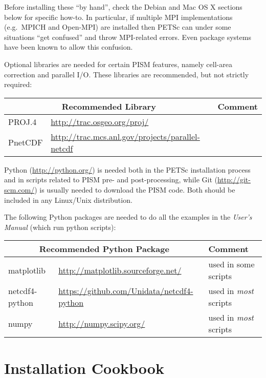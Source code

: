 \documentclass[titlepage,letterpaper,final]{scrartcl}
\begin{document}
Before installing these ``by hand'', check the Debian and Mac OS X sections below for specific how-to.  In particular, if multiple MPI implementations (e.g.~MPICH and Open-MPI) are installed then PETSc can under some situations ``get confused'' and throw MPI-related errors.  Even package systems have been known to allow this confusion.

Optional libraries are needed for certain PISM features, namely cell-area correction and parallel I/O.  These libraries are recommended, but not strictly required: \bigskip

\begin{center}
  \begin{tabular}{lll}
    \toprule
    \multicolumn{2}{c}{\textbf{Recommended Library}} & \textbf{Comment}\\
    \midrule
    PROJ.4 & \url{http://trac.osgeo.org/proj/} & \\
    PnetCDF & \url{http://trac.mcs.anl.gov/projects/parallel-netcdf} & \\
   \bottomrule
  \end{tabular}
\end{center}

\bigskip

Python (\url{http://python.org/}) is needed both in the PETSc installation process and in scripts related to PISM pre- and post-processing, while Git (\url{http://git-scm.com/}) is usually needed to download the PISM code.  Both should be included in any Linux/Unix distribution.

The following Python packages are needed to do all the examples in the \emph{User's Manual} (which run python scripts):
\bigskip

\begin{center}
  \begin{tabular}{lll}
    \toprule
    \multicolumn{2}{c}{\textbf{Recommended Python Package}} & \textbf{Comment}\\
    \midrule
    matplotlib & \url{http://matplotlib.sourceforge.net/} & used in some scripts \\
    netcdf4-python & \url{https://github.com/Unidata/netcdf4-python} & used in \emph{most} scripts \\
    numpy & \url{http://numpy.scipy.org/} & used in \emph{most} scripts \\
   \bottomrule
  \end{tabular}
\end{center}


\section{Installation Cookbook}\label{sec:cookbook}
\end{document}
